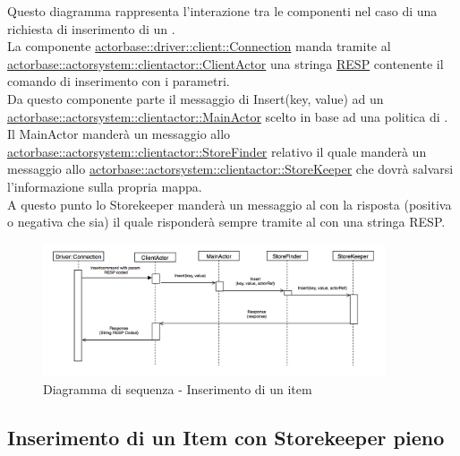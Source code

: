 \documentclass{scalatekids-article}
\begin{document}
Questo diagramma rappresenta l'interazione tra le componenti nel caso di una richiesta di inserimento di un .\\
La componente \hyperref[sec:actorbase::driver::client::Connection]{actorbase::driver::client::Connection}
manda tramite  al \hyperref[sec:actorbase::actorsystem::clientactor::ClientActor]{actorbase::actorsystem::clientactor::ClientActor}
una stringa \hyperref[sec:RESP]{RESP} contenente il comando di inserimento  con
i parametri.\\
Da questo componente parte il messaggio di Insert(key, value) ad un \hyperref[sec:actorbase::actorsystem::clientactor::MainActor]{actorbase::actorsystem::clientactor::MainActor} scelto in base ad una
politica di . Il MainActor manderà un messaggio allo \hyperref[sec:actorbase::actorsystem::clientactor::StoreFinder]{actorbase::actorsystem::clientactor::StoreFinder} relativo il quale manderà un messaggio allo \hyperref[sec:actorbase::actorsystem::clientactor::StoreKeeper]{actorbase::actorsystem::clientactor::StoreKeeper} che dovrà salvarsi l'informazione
sulla propria mappa.\\
A questo punto lo Storekeeper manderà un messaggio al  con la risposta
(positiva o negativa che sia) il quale risponderà sempre tramite  al  con una stringa RESP.
\begin{figure}[H]
  \begin{center}
    \includegraphics[width=0.9\textwidth, keepaspectratio]{img/diagrammiSequenza/esempioInsert.png}
    \caption{Diagramma di sequenza - Inserimento di un item}
  \end{center}
\end{figure}

\subsection{Inserimento di un Item con Storekeeper pieno}
\end{document}
